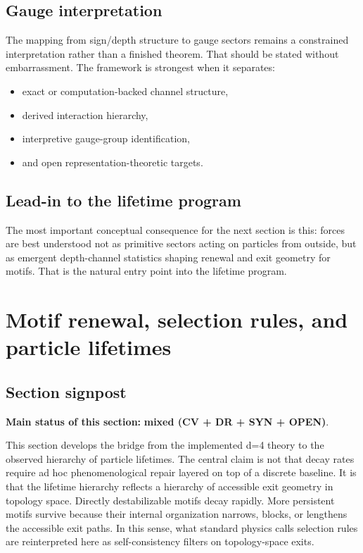 \documentclass[11pt]{article}
\begin{document}
\subsection{Gauge interpretation}
The mapping from sign/depth structure to gauge sectors remains a constrained interpretation rather than a finished theorem. That should be stated without embarrassment. The framework is strongest when it separates:
\begin{itemize}
    \item exact or computation-backed channel structure,
    \item derived interaction hierarchy,
    \item interpretive gauge-group identification,
    \item and open representation-theoretic targets.
\end{itemize}

\subsection{Lead-in to the lifetime program}
The most important conceptual consequence for the next section is this: forces are best understood not as primitive sectors acting on particles from outside, but as emergent depth-channel statistics shaping renewal and exit geometry for motifs. That is the natural entry point into the lifetime program.

\section{Motif renewal, selection rules, and particle lifetimes}\label{sec:lifetimes}
\subsection{Section signpost}
\textbf{Main status of this section:} \textbf{mixed (CV + DR + SYN + OPEN)}.

This section develops the bridge from the implemented d=4 theory to the observed hierarchy of particle lifetimes. The central claim is not that decay rates require ad hoc phenomenological repair layered on top of a discrete baseline. It is that the lifetime hierarchy reflects a hierarchy of accessible exit geometry in topology space. Directly destabilizable motifs decay rapidly. More persistent motifs survive because their internal organization narrows, blocks, or lengthens the accessible exit paths. In this sense, what standard physics calls selection rules are reinterpreted here as self-consistency filters on topology-space exits.
\end{document}
